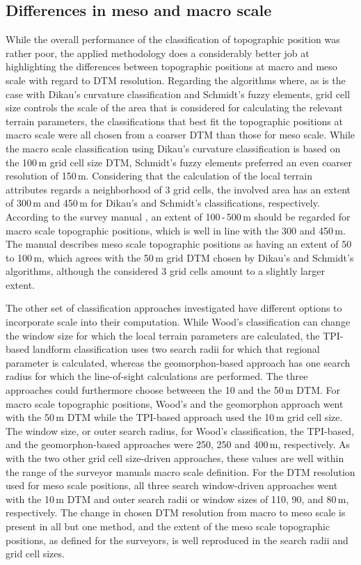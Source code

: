 \documentclass[preprint,12pt,authoryear]{elsarticle}
\begin{document}
\subsection{Differences in meso and macro scale}
While the overall performance of the classification of topographic position was rather poor, the applied methodology does a considerably better job at highlighting the differences between topographic positions at macro and meso scale with regard to DTM resolution.
Regarding the algorithms where, as is the case with Dikau's curvature classification and Schmidt's fuzzy elements, grid cell size controls the scale of the area that is considered for calculating the relevant terrain parameters, the classifications that best fit the topographic positions at macro scale were all chosen from a coarser DTM than those for meso scale. While the macro scale classification using Dikau's curvature classification is based on the 100\,m grid cell size DTM, Schmidt's fuzzy elements preferred an even coarser resolution of 150\,m. Considering that the calculation of the local terrain attributes regards a neighborhood of 3 grid cells, the involved area has an extent of 300\,m and 450\,m for Dikau's and Schmidt's classifications, respectively. According to the survey manual \citep{Englisch1998}, an extent of 100\,-\,500\,m should be regarded for macro scale topographic positions, which is well in line with the 300 and 450\,m. The manual describes meso scale topographic positions as having an extent of 50 to 100\,m, which agrees with the 50\,m grid DTM chosen by Dikau's and Schmidt's algorithms, although the considered 3 grid cells amount to a slightly larger extent.

The other set of classification approaches investigated have different options to incorporate scale into their computation. While Wood's classification can change the window size for which the local terrain parameters are calculated, the TPI-based landform classification uses two search radii for which that regional parameter is calculated, whereas the geomorphon-based approach has one search radius for which the line-of-sight calculations are performed. The three approaches could furthermore choose betweeen the 10 and the 50\,m DTM. For macro scale topographic positions, Wood's and the geomorphon approach went with the 50\,m DTM while the TPI-based approach used the 10\,m grid cell size. The window size, or outer search radius, for Wood's classification, the TPI-based, and the geomorphon-based approaches were 250, 250 and 400\,m, respectively. As with the two other grid cell size-driven approaches, these values are well within the range of the surveyor manuals macro scale definition. For the DTM resolution used for meso scale positions, all three search window-driven approaches went with the 10\,m DTM and outer search radii or window sizes of 110, 90, and 80\,m, respectively. The change in chosen DTM resolution from macro to meso scale is present in all but one method, and the extent of the meso scale topographic positions, as defined for the surveyors, is well reproduced in the search radii and grid cell sizes.
\end{document}
